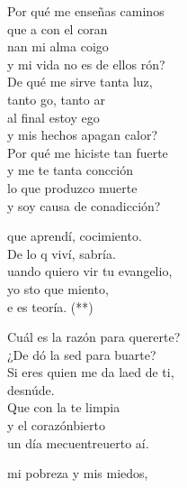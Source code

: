 \begin{cancion}%
	Por qué me enseñas caminos \\
	que a con el coran\\
	nan mi alma coigo\\
	y mi vida no es de ellos rón?\\
	De qué me sirve tanta luz, \\
	tanto go, tanto ar\\
	al final estoy ego \\
	y mis hechos apagan  calor?\\
	Por qué me hiciste tan fuerte \\
	y me te tanta concción\\
	lo que produzco  muerte \\
	y soy causa de conadicción?\jump\\
	\begin{chorus}%
		que aprendí, cocimiento. \\
		De lo q viví, sabría.\\
		uando quiero vir tu evangelio, \\
		yo sto que miento,\\
		e es teoría. (**)\jump\\
	\end{chorus}%
	Cuál es la razón para quererte?\\
	¿De dó la sed para buarte?\\
	Si eres  quien me da laed de ti, \\
	desnúde.\\
	Que con la te limpia \\
	y el corazónbierto\\
	un día mecuentreuerto aí.\jump\\
	\begin{chorus}%
		mi pobreza y  mis miedos, \\

\end{chorus}
\end{cancion}
